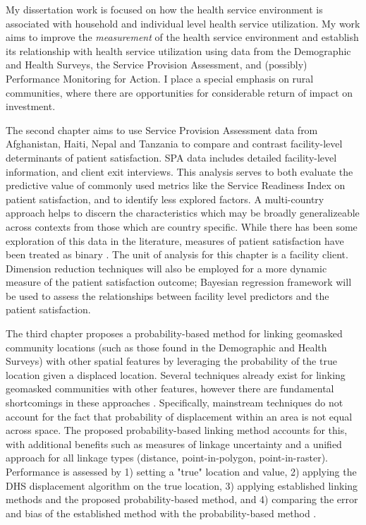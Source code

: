 My dissertation work is focused on how the health service environment is associated with household and individual level health service utilization. My work aims to improve the \textit{measurement} of the health service environment and establish its relationship with health service utilization using data from the Demographic and Health Surveys, the Service Provision Assessment, and (possibly) Performance Monitoring for Action. I place a special emphasis on rural communities, where there are opportunities for considerable return of impact on investment.

The second chapter aims to use Service Provision Assessment data from Afghanistan, Haiti, Nepal and Tanzania to compare and contrast facility-level determinants of patient satisfaction. SPA data includes detailed facility-level information, and client exit interviews. This analysis serves to both evaluate the predictive value of commonly used metrics like the Service Readiness Index on patient satisfaction, and to identify less explored factors. A multi-country approach helps to discern the characteristics which may be broadly generalizeable across contexts from those which are country specific. While there has been some exploration of this data in the literature, measures of patient satisfaction have been treated as binary \autocite{bergh_identifying_2022}. The unit of analysis for this chapter is a facility client. Dimension reduction techniques will also be employed for a more dynamic measure of the patient satisfaction outcome; Bayesian regression framework will be used to assess the relationships between facility level predictors and the patient satisfaction.

The third chapter proposes a probability-based method for linking geomasked community locations (such as those found in the Demographic and Health Surveys) with other spatial features by leveraging the probability of the true location given a displaced location. Several techniques already exist for linking geomasked communities with other features, however there are fundamental shortcomings in these approaches \autocite{skiles_geographically_2013, warren_influence_2016-1, warren_influence_2016, perez-heydrich_influence_2016}. Specifically, mainstream techniques do not account for the fact that probability of displacement within an area is not equal across space. The proposed probability-based linking method accounts for this, with additional benefits such as measures of linkage uncertainty and a unified approach for all linkage types (distance, point-in-polygon, point-in-raster). Performance is assessed by 1) setting a "true" location and value, 2) applying the DHS displacement algorithm on the true location, 3) applying established linking methods and the proposed probability-based method, and 4) comparing the error and bias of the established method with the probability-based method \autocite{morris_using_2019}.

